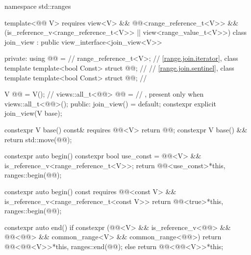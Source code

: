 %
%
%
%
\begin{codeblock}
namespace std::ranges {
  template<@@ V>
    requires view<V> && @@<range_reference_t<V>> &&
             (is_reference_v<range_reference_t<V>> ||
              view<range_value_t<V>>)
  class join_view : public view_interface<join_view<V>> {
  private:
    using @@ =                    // \expos
      range_reference_t<V>;
    // \ref{range.join.iterator}, class template 
    template<bool Const>
      struct @@;                  // \expos
    // \ref{range.join.sentinel}, class template 
    template<bool Const>
      struct @@;                  // \expos

    V @@ = V();                      // \expos
    views::all_t<@@> @@ =     // \expos, present only when 
      views::all_t<@@>();
  public:
    join_view() = default;
    constexpr explicit join_view(V base);

    constexpr V base() const& requires @@<V> { return @@; }
    constexpr V base() && { return std::move(@@); }

    constexpr auto begin() {
      constexpr bool use_const = @@<V> &&
                                 is_reference_v<range_reference_t<V>>;
      return @@<use_const>{*this, ranges::begin(@@)};
    }

    constexpr auto begin() const
    requires @@<const V> &&
             is_reference_v<range_reference_t<const V>> {
      return @@<true>{*this, ranges::begin(@@)};
    }

    constexpr auto end() {
      if constexpr (@@<V> &&
                    is_reference_v<@@> && @@<@@> &&
                    common_range<V> && common_range<@@>)
        return @@<@@<V>>{*this, ranges::end(@@)};
      else
        return @@<@@<V>>{*this};
    }

}}
\end{codeblock}
